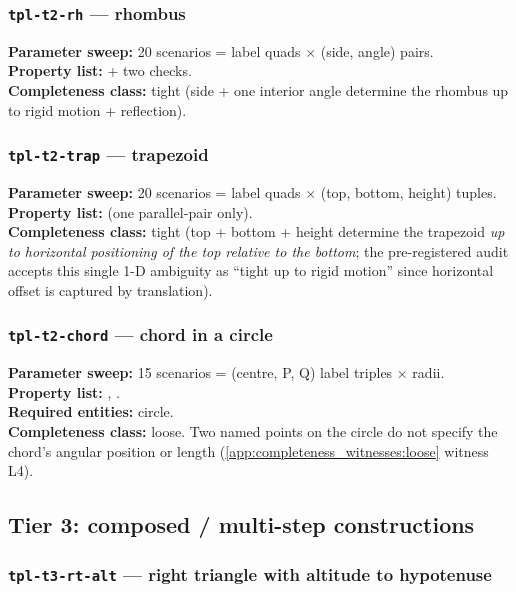 \subsubsection{\texttt{tpl-t2-rh} --- rhombus}

\textbf{Parameter sweep:} 20 scenarios = label quads $\times$ (side, angle) pairs.\\
\textbf{Property list:}  + two  checks.\\
\textbf{Completeness class:} tight (side + one interior angle determine the rhombus up to rigid motion + reflection).

\subsubsection{\texttt{tpl-t2-trap} --- trapezoid}

\textbf{Parameter sweep:} 20 scenarios = label quads $\times$ (top, bottom, height) tuples.\\
\textbf{Property list:}  (one parallel-pair only).\\
\textbf{Completeness class:} tight (top + bottom + height determine the trapezoid \emph{up to horizontal positioning of the top relative to the bottom}; the pre-registered audit accepts this single 1-D ambiguity as ``tight up to rigid motion'' since horizontal offset is captured by translation).

\subsubsection{\texttt{tpl-t2-chord} --- chord in a circle}

\textbf{Parameter sweep:} 15 scenarios = (centre, P, Q) label triples $\times$ radii.\\
\textbf{Property list:} , .\\
\textbf{Required entities:} circle.\\
\textbf{Completeness class:} loose. Two named points on the circle do not specify the chord's angular position or length (\cref{app:completeness_witnesses:loose} witness L4).

\subsection{Tier 3: composed / multi-step constructions}

\subsubsection{\texttt{tpl-t3-rt-alt} --- right triangle with altitude to hypotenuse}

